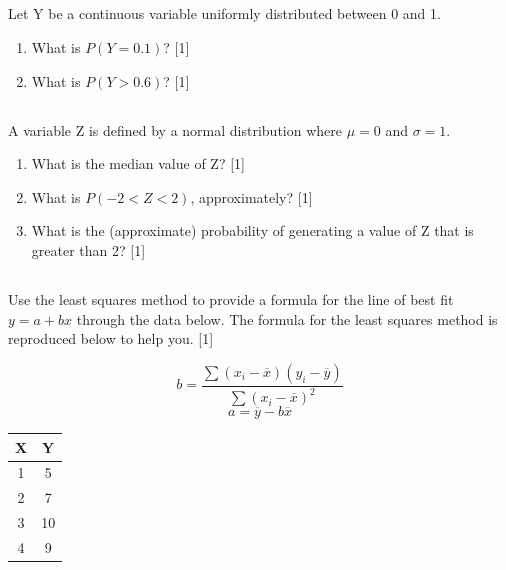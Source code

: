\documentclass[twocolumn]{article}
\newcounter{pmarks}
\newcounter{marks}
\newcommand\mrk[1]{{\hfill\color{blue}\small[{#1}]}\addtocounter{pmarks}{#1}\addtocounter{marks}{#1}}
\begin{document}
\subsection{}

Let Y be a continuous variable uniformly distributed between 0 and 1.

\begin{enumerate}
    \item What is $P(Y = 0.1)$? \mrk{1}
    \item What is $P(Y > 0.6)$? \mrk{1}
\end{enumerate}

\subsection{}

A variable Z is defined by a normal distribution where $\mu = 0$ and $\sigma = 1$.

\begin{enumerate}
    \item What is the median value of Z? \mrk{1}
    \item What is $P(-2 < Z < 2)$, approximately? \mrk{1}
    \item What is the (approximate) probability of generating a value of Z that is greater than 2? \mrk{1}
\end{enumerate}

\iffalse


\subsection{}

    Use the least squares method to provide a formula for the line of best fit $y = a + bx$ through the data below. The formula for the least squares method is reproduced below to help you. \mrk{1}

    \begin{multicols}{2}
    $$ b = \frac{\sum{(x_i - \overline{x})(y_i - \overline{y})}}{\sum{(x_i - \overline{x})^2}} $$
    $$ a = \overline{y} - b\overline{x}$$
    \begin{center}
        \begin{tabular}{c | c}
            \toprule
            X & Y  \\
            \midrule
            1 & 5 \\
            2 & 7 \\
            3 & 10 \\
            4 & 9 \\
            \bottomrule
        \end{tabular}        
    \end{center}
\end{multicols}
\end{document}
